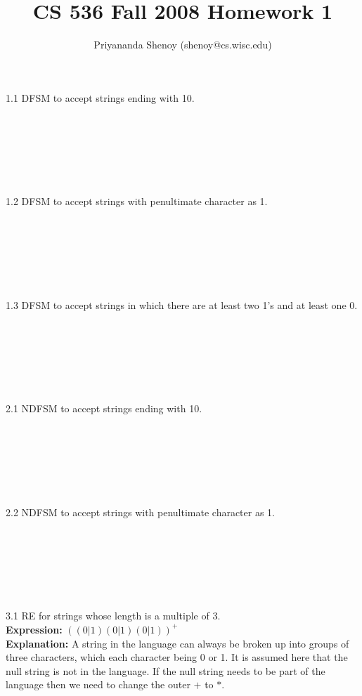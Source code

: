 \documentclass[11pt]{article}
\author{Priyananda Shenoy (shenoy@cs.wisc.edu)}
\title{
	CS 536 Fall 2008 Homework 1
}
\begin{document}
\maketitle
\newpage

1.1 DFSM to accept strings ending with 10. \\
\begin{verbatim}







\end{verbatim}
1.2 DFSM to accept strings with penultimate character as 1. \\
\begin{verbatim}







\end{verbatim}
1.3 DFSM to accept strings in which there are at least two 1's and at least one 0.
\begin{verbatim}







\end{verbatim}

2.1 NDFSM to accept strings ending with 10. \\
\begin{verbatim}







\end{verbatim}
2.2 NDFSM to accept strings with penultimate character as 1. \\
\begin{verbatim}







\end{verbatim}

3.1 RE for strings whose length is a multiple of 3. \\
\textbf{Expression:} $\left( (0 | 1)(0 | 1)(0 | 1) \right)^+$ \\
\textbf{Explanation:} A string in the language can always be broken up into groups of three characters, which each
character being 0 or 1. It is assumed here that the null string is not in the language. If the null string needs to
be part of the language then we need to change the outer $+$ to $*$. \\
\end{document}
